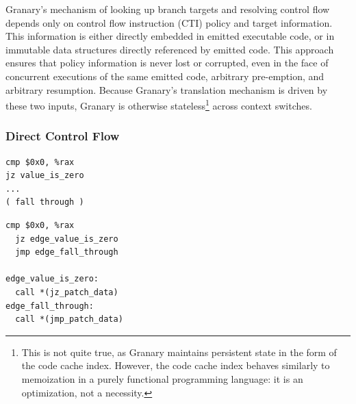\documentclass[preprint]{sigplanconf}
\begin{document}
Granary's mechanism of looking up branch targets and resolving control flow depends only on control flow instruction (CTI) policy and target information. This information is either directly embedded in emitted executable code, or in immutable data structures directly referenced by emitted code. This approach ensures that policy information is never lost or corrupted, even in the face of concurrent executions of the same emitted code, arbitrary pre-emption, and arbitrary resumption. Because Granary's translation mechanism is driven by these two inputs, Granary is otherwise stateless\footnote{This is not quite true, as Granary maintains persistent state in the form of the code cache index. However, the code cache index behaves similarly to memoization in a purely functional programming language: it is an optimization, not a necessity.} across context switches.

\subsubsection{Direct Control Flow}
\lstset{language=[x64]Assembler}
\newsavebox\nativejcc
\begin{lrbox}{\nativejcc}
\begin{minipage}[b]{4cm}
\begin{lstlisting}[basicstyle=\scriptsize\ttfamily]
cmp $0x0, %rax
jz value_is_zero 
...
( fall through )
\end{lstlisting}
\end{minipage}
\end{lrbox}

\newsavebox\translatedjcc
\begin{lrbox}{\translatedjcc}\begin{minipage}[b]{4cm}\begin{lstlisting}[basicstyle=\scriptsize\ttfamily]
  cmp $0x0, %rax
  jz edge_value_is_zero
  jmp edge_fall_through

edge_value_is_zero:
  call *(jz_patch_data)
edge_fall_through:
  call *(jmp_patch_data)
\end{lstlisting}
\end{minipage}
\end{lrbox}
\end{document}
